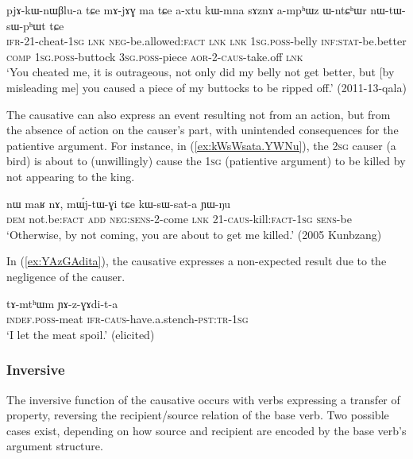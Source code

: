 \begin{exe}
\ex \label{amphWz.nWtWsWphWt} 
\gll pjɤ-kɯ-nɯβlu-a tɕe mɤ-jɤɣ ma tɕe a-xtu kɯ-mna sɤznɤ a-mpʰɯz ɯ-ntɕʰɯr nɯ-tɯ-sɯ-pʰɯt tɕe \\
\textsc{ifr}-2\fl{}1-cheat-\textsc{1sg} \textsc{lnk} \textsc{neg}-be.allowed:\textsc{fact} \textsc{lnk} \textsc{lnk} \textsc{1sg}.\textsc{poss}-belly \textsc{inf}:\textsc{stat}-be.better \textsc{comp} \textsc{1sg}.\textsc{poss}-buttock \textsc{3sg}.\textsc{poss}-piece \textsc{aor}-2-\textsc{caus}-take.off \textsc{lnk} \\
\glt `You cheated me, it is outrageous, not only did my belly not get better, but [by misleading me] you caused a piece of my buttocks to be ripped off.' (2011-13-qala)
\end{exe}

The causative can also express an event resulting not from an action, but from the absence of action on the causer's part, with unintended consequences for the patientive argument. For instance, in (\ref{ex:kWsWsata.YWNu}), the \textsc{2sg} causer (a bird) is about to (unwillingly) cause the \textsc{1sg} (patientive argument) to be killed by not appearing to the king. 

\begin{exe}
\ex \label{ex:kWsWsata.YWNu}
\gll  nɯ maʁ nɤ, mɯ́j-tɯ-ɣi tɕe kɯ-sɯ-sat-a ɲɯ-ŋu \\
\textsc{dem} not.be:\textsc{fact} \textsc{add} \textsc{neg}:\textsc{sens}-2-come \textsc{lnk} 2\fl{}1-\textsc{caus}-kill:\textsc{fact}-\textsc{1sg} \textsc{sens}-be \\
\glt `Otherwise, by not coming, you are about to get me killed.' (2005 Kunbzang)
\end{exe}

In (\ref{ex:YAzGAdita}), the causative expresses a non-expected result due to the negligence of the causer.

\begin{exe}
\ex \label{ex:YAzGAdita}
\gll tɤ-mtʰɯm ɲɤ-z-ɣɤdi-t-a   \\
\textsc{indef}.\textsc{poss}-meat \textsc{ifr}-\textsc{caus}-have.a.stench-\textsc{pst}:\textsc{tr}-\textsc{1sg} \\
 \glt  `I let the meat spoil.' (elicited)
\end{exe}

\subsubsection{Inversive} \label{sec:sig.caus.inversive}
The inversive function of the causative occurs with verbs expressing a transfer of property, reversing the recipient/source relation of the base verb. Two possible cases exist, depending on how source and recipient are encoded by the base verb's argument structure.

